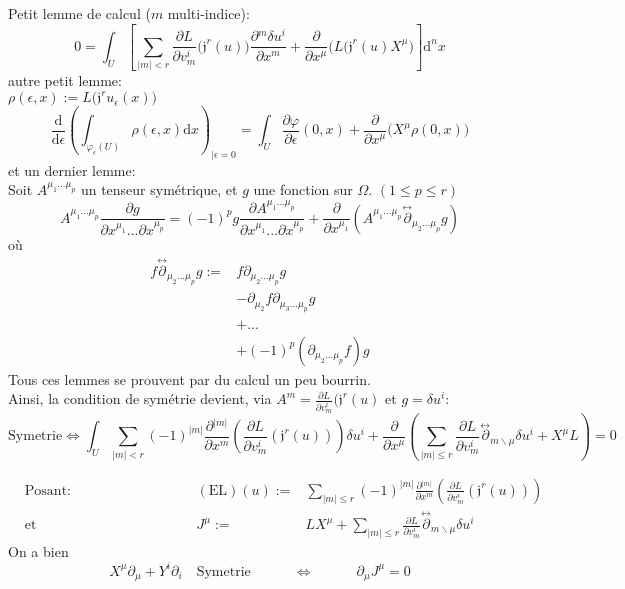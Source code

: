 \documentclass[a4paper,11pt]{article}
\renewcommand{\d}{{\mathrm{d}}}
\newcommand{\dr}[2]{\frac{\partial {#1}}{\partial{#2}}}
\begin{document}
Petit lemme de calcul ($m$ multi-indice):
$$0 = \int_U \left[\sum_{|m|<r}\dr L{v^i_m}\big(\mathfrak{j}^r(u)\big)\dr{^m\delta u^i}{x^m}+\dr{}{x^\mu}\big(L(\mathfrak{j}^r(u)X^\mu\big) \right] \d^n x$$
autre petit lemme:\\
$\rho(\epsilon,x):=L\big(\mathfrak{j}^ru_\epsilon(x)\big)$
$$\frac{\d}{\d \epsilon}\left( \int_{\varphi_\epsilon(U)}\rho(\epsilon,x) \d  x \right) _{\Big|\epsilon=0} = \int_U \dr\varphi\epsilon(0,x)+\dr{}{x^\mu}\big(X^\mu\rho(0,x)\big)$$
et un dernier lemme:\\
Soit $A^{\mu_1 ... \mu_p}$ un tenseur symétrique, et $g$ une fonction sur $\Omega$. $(1\leq p\leq r)$
$$A^{\mu_1...\mu_p} \dr g{x^{\mu_1}...\partial x^{\mu_p}} = (-1)^p g \dr{A^{\mu_1...\mu_p}}{x^{\mu_1}...\partial x^{\mu_p}} + \dr{}{x^{\mu_1}}\left(A^{\mu_1...\mu_p}\overset{\leftrightarrow}\partial_{\mu_2...\mu_p}g\right)$$
où
\begin{align*}
f\overset{\leftrightarrow}\partial_{\mu_2...\mu_p} g:=
& f \partial_{\mu_2...\mu_p} g\\
&- \partial_{\mu_2} f \partial_{\mu_3...\mu_p} g\\
&+ ...\\
&+ (-1)^p (\partial_{\mu_2...\mu_p} f) g
\end{align*}
Tous ces lemmes se prouvent par du calcul un peu bourrin.\\
Ainsi, la condition de symétrie devient, via $A^m=\dr L{v^i_m}(\mathfrak{j}^r(u)$ et $g=\delta u^i$:
$$\mathrm{Symetrie} \iff \int_U \sum_{|m|<r} (-1)^{|m|} \dr{^{|m|}}{x^m}\left(\dr L{v^i_m}(\mathfrak{j}^r(u))\right)\delta u^i + \dr{}{x^\mu} \left(\sum_{|m|\leq r} \dr L{v^i_m}\overset{\leftrightarrow}\partial_{m\backslash\mu} \delta u^i + X^\mu L\right) = 0$$

\begin{align*}
&\mathrm{Posant}:\quad\quad\quad\quad\quad\quad\quad\quad&(\mathrm{EL})(u):=& \sum_{|m|\leq r} (-1)^{|m|} \dr{^{|m|}}{x^m}\left(\dr L{v^i_m}(\mathfrak{j}^r(u))\right)
\quad\quad\quad\quad\quad\quad\quad\quad\quad\quad\\
&\mathrm{et}&
J^\mu :=& LX^\mu + \sum_{|m|\leq r} \dr L{v^i_m} \overset{\leftrightarrow}\partial_{m\backslash\mu} \delta u^i
\end{align*}
On a bien
$$X^\mu \partial_\mu + Y^i \partial_i\quad\mathrm{Symetrie} \quad \quad \quad \iff\quad \quad \quad 
 \partial_\mu J^\mu = 0$$
\end{document}
